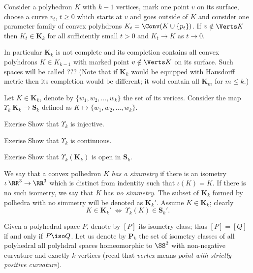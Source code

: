 Consider a polyhedron $K$ with $k-1$ vertices,
mark one point $v$ on its surface, choose a curve $v_t$, $t\ge 0$ 
which starts at $v$ 
and goes outside of $K$ and consider one parameter family of convex polyhdrons
$K_t=\Conv(K\cup \{p_t\})$.
If $v\notin\Verts K$ then $K_t\in\mathbf{K}_k$ for all sufficiently small $t>0$ and $K_t\to K$ as $t\to 0$.

In particular $\mathbf{K}_k$ is not complete 
and its completion contains all convex polyhdrons $K\in K_{k-1}$ 
with marked point $v\notin \Verts K$ on its surface.
Such spaces will be called ???
(Note that if $\mathbf{K}_k$ would be equipped with Hausdorff metric then its completion would be different;
it wold contain all $\mathbf{K}_m$ for $m\le k$.)


 



Let $K\in \mathbf{K}_k$, denote by $\{w_1,w_2,\dots,w_k\}$ the set of its verices.
Consider the map $\Upsilon_k\:\mathbf{K}_k\to \mathbf{S}_k$ defined as $K\mapsto \{w_1,w_2,\dots,w_k\}$. 

\begin{thm}{Exerise}
Show that $\Upsilon_k$ is injective. 
\end{thm}

\begin{thm}{Exerise}
Show that $\Upsilon_k$ is continuous. 
\end{thm}

\begin{thm}{Exerise}
Show that $\Upsilon_k(\mathbf{K}_k)$ is open in $\mathbf{S}_k$. 
\end{thm}

We say that a convex polhedron $K$ \emph{has a simmetry} if there is an isometry $\iota\:\RR^3\to\RR^3$ which is distinct from indentity
such that $\iota(K)=K$.
If there is no such isometry, we say that  $K$ has \emph{no simmetry}.
The subset of $\mathbf{K}_k$ formed by polhedra with no simmetry will be denoted as $\mathbf{K}_k'$.
Assume $K\in \mathbf{K}_k$;
clearly 
$$K\in   \mathbf{K}_k'\ \iff\ \Upsilon_k(K)\in \mathbf{S}_k'.$$

Given a polyhedral space $P$,
denote by $[P]$ its isometry class;
thus $[P]=[Q]$ if and only if $P\iso Q$.
Let us denote by $\mathbf{P}_k$ the set of isometry classes of all polyhedral all polyhdral spaces homeomorphic to $\SS^2$  
with non-negative curvature 
and exactly $k$ vertices (recal that \textit{vertex} means \textit{point with strictly positive curvature}).

